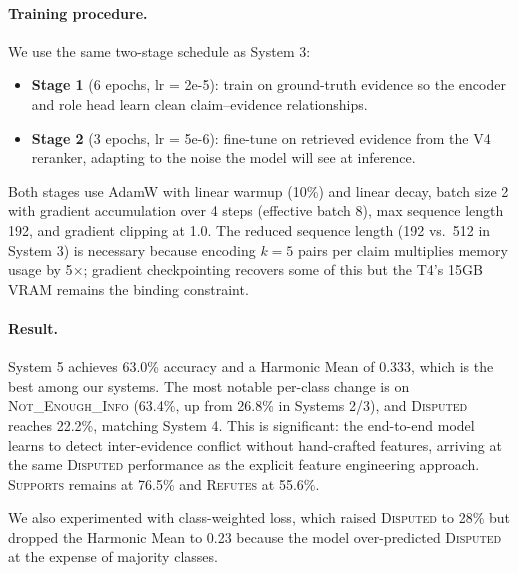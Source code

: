 \documentclass[11pt]{article}
\begin{document}
\paragraph{Training procedure.}
We use the same two-stage schedule as System 3:
\begin{itemize}
  \item \textbf{Stage 1} (6 epochs, lr = 2e-5): train on ground-truth
        evidence so the encoder and role head learn clean
        claim--evidence relationships.
  \item \textbf{Stage 2} (3 epochs, lr = 5e-6): fine-tune on retrieved
        evidence from the V4 reranker, adapting to the noise the model
        will see at inference.
\end{itemize}
Both stages use AdamW with linear warmup (10\%) and linear decay,
batch size 2 with gradient accumulation over 4 steps (effective
batch 8), max sequence length 192, and gradient clipping at 1.0.
The reduced sequence length (192 vs.\ 512 in System 3) is necessary
because encoding $k{=}5$ pairs per claim multiplies memory usage
by 5$\times$; gradient checkpointing recovers some of this but the
T4's 15GB VRAM remains the binding constraint.

\paragraph{Result.}
System 5 achieves 63.0\% accuracy and a Harmonic Mean of 0.333, which is
the best among our systems.
The most notable per-class change is on \textsc{Not\_Enough\_Info}
(63.4\%, up from 26.8\% in Systems 2/3), and \textsc{Disputed}
reaches 22.2\%, matching System 4.
This is significant: the end-to-end model learns to detect
inter-evidence conflict without hand-crafted features, arriving at
the same \textsc{Disputed} performance as the explicit feature
engineering approach.
\textsc{Supports} remains at 76.5\% and \textsc{Refutes} at 55.6\%.

We also experimented with class-weighted loss, which raised
\textsc{Disputed} to 28\% but dropped the Harmonic Mean to 0.23
because the model over-predicted \textsc{Disputed} at the expense of
majority classes.
\end{document}
